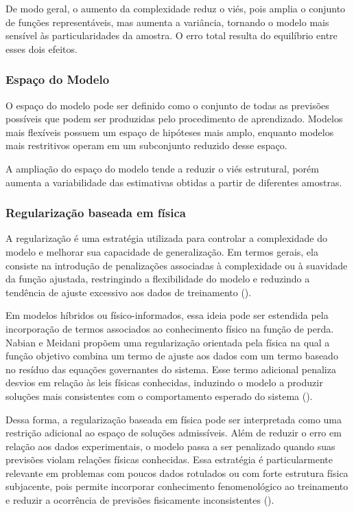 De modo geral, o aumento da complexidade reduz o viés, pois amplia o conjunto de funções representáveis, mas aumenta a variância, tornando o modelo mais sensível às particularidades da amostra. O erro total resulta do equilíbrio entre esses dois efeitos.


\subsubsection{Espaço do Modelo}

O espaço do modelo pode ser definido como o conjunto de todas as previsões possíveis que podem ser produzidas pelo procedimento de aprendizado. Modelos mais flexíveis possuem um espaço de hipóteses mais amplo, enquanto modelos mais restritivos operam em um subconjunto reduzido desse espaço.

A ampliação do espaço do modelo tende a reduzir o viés estrutural, porém aumenta a variabilidade das estimativas obtidas a partir de diferentes amostras.

\subsubsection{Regularização baseada em física}

A regularização é uma estratégia utilizada para controlar a complexidade do modelo e melhorar sua capacidade de generalização. Em termos gerais, ela consiste na introdução de penalizações associadas à complexidade ou à suavidade da função ajustada, restringindo a flexibilidade do modelo e reduzindo a tendência de ajuste excessivo aos dados de treinamento (\cite{Tian2022}).

Em modelos híbridos ou físico-informados, essa ideia pode ser estendida pela incorporação de termos associados ao conhecimento físico na função de perda. Nabian e Meidani propõem uma regularização orientada pela física na qual a função objetivo combina um termo de ajuste aos dados com um termo baseado no resíduo das equações governantes do sistema. Esse termo adicional penaliza desvios em relação às leis físicas conhecidas, induzindo o modelo a produzir soluções mais consistentes com o comportamento esperado do sistema (\cite{Nabian2020}).

Dessa forma, a regularização baseada em física pode ser interpretada como uma restrição adicional ao espaço de soluções admissíveis. Além de reduzir o erro em relação aos dados experimentais, o modelo passa a ser penalizado quando suas previsões violam relações físicas conhecidas. Essa estratégia é particularmente relevante em problemas com poucos dados rotulados ou com forte estrutura física subjacente, pois permite incorporar conhecimento fenomenológico ao treinamento e reduzir a ocorrência de previsões fisicamente inconsistentes (\cite{Nabian2020}).
